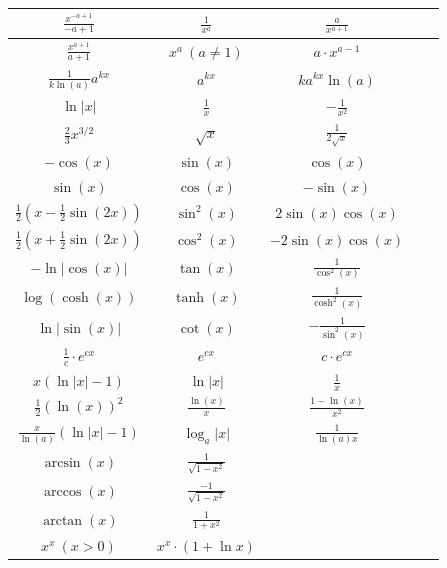 \documentclass[a4paper]{article}
\begin{document}
\begin{table}[h!]
{{\begin{tabular}{c | c | c | c | c}
          $\frac{x^{-a+1}}{-a+1}$                & $\frac{1}{x^a}$             & $\frac{a}{x^{a+1}}$      \\\hline
          $\frac{x^{a+1}}{a+1}$                  & $x^a \ (a \ne 1)$           & $a \cdot x^{a-1}$        \\\hline
          $\frac{1}{k \ln(a)}a^{kx}$             & $a^{kx}$                    & $ka^{kx} \ln(a)$         \\\hline
          $\ln |x|$                              & $\frac{1}{x}$               & $-\frac{1}{x^2}$         \\\hline
          $\frac{2}{3}x^{3/2}$                   & $\sqrt{x}$                  & $\frac{1}{2\sqrt{x}}$    \\\hline
          $-\cos(x)$                             & $\sin(x)$                   & $\cos(x)$                \\\hline
          $\sin(x)$                              & $\cos(x)$                   & $-\sin(x)$               \\\hline
          $\frac{1}{2}(x-\frac{1}{2}\sin(2x))$   & $\sin^2(x)$                 & $2 \sin(x)\cos(x)$       \\\hline
          $\frac{1}{2}(x + \frac{1}{2}\sin(2x))$ & $\cos^2(x)$                 & $-2\sin(x)\cos(x)$       \\\hline
          $-\ln|\cos(x)|$                        & $\tan(x)$                   & $\frac{1}{\cos^2(x)}$    \\\hline
          $\log(\cosh(x))$                       & $\tanh(x)$                  & $\frac{1}{\cosh^2(x)}$   \\\hline
          $\ln | \sin(x)|$                       & $\cot(x)$                   & $-\frac{1}{\sin^2(x)}$   \\\hline
          $\frac{1}{c} \cdot e^{cx}$             & $e^{cx}$                    & $c \cdot e^{cx}$         \\\hline
          $x(\ln |x| - 1)$                       & $\ln |x|$                   & $\frac{1}{x}$            \\\hline
          $\frac{1}{2}(\ln(x))^2$                & $\frac{\ln(x)}{x}$          & $\frac{1 - \ln(x)}{x^2}$ \\\hline
          $\frac{x}{\ln(a)} (\ln|x| -1)$         & $\log_a |x|$                & $\frac{1}{\ln(a)x}$      \\\hline
          $\arcsin(x)$                           & $\frac{1}{\sqrt{1 - x^2}}$  &                         \\\hline
          $\arccos(x)$                           & $\frac{-1}{\sqrt{1 - x^2}}$ &                         \\\hline
          $\arctan(x)$                           & $\frac{1}{1 + x^2}$         &                         \\\hline
          $x^x \ (x > 0)$                        & $x^x \cdot (1 + \ln x)$     &                         \\\hline
      \end{tabular}}
}
\end{table}
\end{document}
